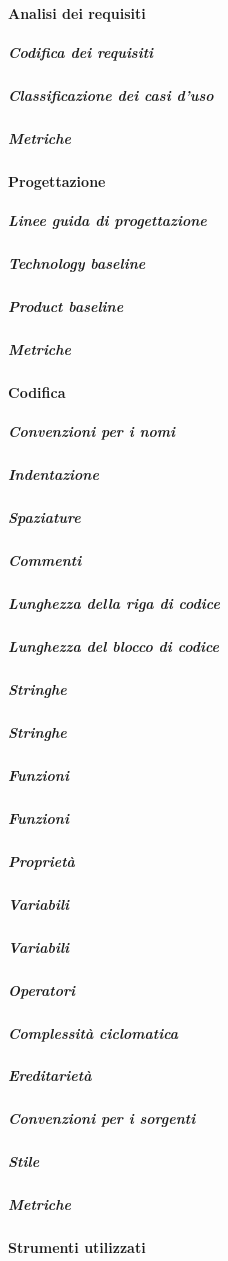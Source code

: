 \paragraph{Analisi dei requisiti} 

\subparagraph{Codifica dei requisiti} 

\subparagraph{Classificazione dei casi d'uso} 

\subparagraph{Metriche} 

\paragraph{Progettazione} 

\subparagraph{Linee guida di progettazione} 

\subparagraph{Technology baseline} 

\subparagraph{Product baseline} 

\subparagraph{Metriche} 

\paragraph{Codifica} 

\subparagraph{Convenzioni per i nomi}

\subparagraph{Indentazione} 

\subparagraph{Spaziature} 

\subparagraph{Commenti} 

\subparagraph{Lunghezza della riga di codice} 

\subparagraph{Lunghezza del blocco di codice} 

\subparagraph{Stringhe} 

\subparagraph{Stringhe} 

\subparagraph{Funzioni} 

\subparagraph{Funzioni} 

\subparagraph{Proprietà} 

\subparagraph{Variabili} 

\subparagraph{Variabili} 

\subparagraph{Operatori} 

\subparagraph{Complessità ciclomatica} 

\subparagraph{Ereditarietà} 

\subparagraph{Convenzioni per i sorgenti} 

\subparagraph{Stile} 

\subparagraph{Metriche} 

\paragraph{Strumenti utilizzati} 

